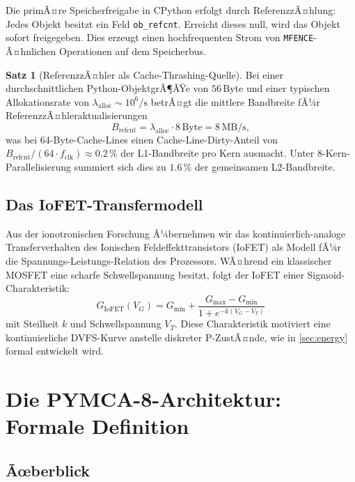 ﻿\documentclass[a4paper,12pt]{scrreprt}
\theoremstyle{definition}
\newtheorem{satz}{Satz}[section]
\begin{document}
	Die primÃ¤re Speicherfreigabe in CPython erfolgt durch ReferenzzÃ¤hlung:
	Jedes Objekt besitzt ein Feld \texttt{ob\_refcnt}. Erreicht dieses
	null, wird das Objekt sofort freigegeben. Dies erzeugt einen
	hochfrequenten Strom von \texttt{MFENCE}-Ã¤hnlichen Operationen auf
	dem Speicherbus.
	
	\begin{satz}[ReferenzzÃ¤hler als Cache-Thrashing-Quelle]
		\label{satz:refcount}
		Bei einer durchschnittlichen Python-ObjektgrÃ¶ÃŸe von $56$\,Byte und
		einer typischen Allokationsrate von $\lambda_{\mathrm{alloc}} \sim 10^6/\mathrm{s}$
		betrÃ¤gt die mittlere Bandbreite fÃ¼r ReferenzzÃ¤hleraktualisierungen
		\[
		B_{\mathrm{refcnt}} = \lambda_{\mathrm{alloc}} \cdot 8\,\mathrm{Byte}
		= 8\,\mathrm{MB/s},
		\]
		was bei $64$-Byte-Cache-Lines einen Cache-Line-Dirty-Anteil von
		$B_{\mathrm{refcnt}} / (64 \cdot f_{\mathrm{clk}}) \approx 0.2\,\%$
		der L1-Bandbreite pro Kern ausmacht. Unter 8-Kern-Parallelisierung
		summiert sich dies zu $1.6\,\%$ der gemeinsamen L2-Bandbreite.
	\end{satz}
	
	\subsection{Das IoFET-Transfermodell}
	
	Aus der ionotronischen Forschung \cite{epp2026iono} Ã¼bernehmen wir das
	kontinuierlich-analoge Transferverhalten des Ionischen Feldeffekttransistors
	(IoFET) als Modell fÃ¼r die Spannungs-Leistungs-Relation des Prozessors.
	WÃ¤hrend ein klassischer MOSFET eine scharfe Schwellspannung besitzt,
	folgt der IoFET einer Sigmoid-Charakteristik:
	\begin{equation}
		G_{\mathrm{IoFET}}(V_G) = G_{\min} + \frac{G_{\max} - G_{\min}}{
			1 + e^{-k(V_G - V_{T})}}
		\label{eq:iofet}
	\end{equation}
	mit Steilheit $k$ und Schwellspannung $V_T$. Diese Charakteristik motiviert
	eine kontinuierliche DVFS-Kurve anstelle diskreter P-ZustÃ¤nde, wie in
	\cref{sec:energy} formal entwickelt wird.
	
	\section{Die PYMCA-8-Architektur: Formale Definition}
	
	\subsection{Ãœberblick}
	
\end{document}
